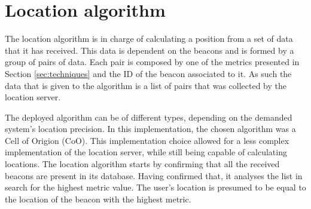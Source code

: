 \section{Location algorithm} 
\label{sec:algos} 
 
 
The location algorithm is in charge of calculating a position from a set of data that it has received. This data is dependent on the beacons and is formed by a group of pairs of data. Each pair is composed by one of the metrics presented in Section \ref{sec:techniques} and the ID of the beacon associated to it. As such the data that is given to the algorithm is a list of pairs that was collected by the location server. 
 
 
The deployed algorithm can be of different types, depending on the demanded system's location precision. In this implementation, the chosen algorithm was a Cell of Origion (CoO). This implementation choice allowed for a less complex implementation of the location server, while still being capable of calculating locations. The location algorithm starts by confirming that all the received beacons are present in its database. Having confirmed that, it analyses the list in search for the highest metric value. The user's location is presumed to be equal to the location of the beacon with the highest metric. 
 